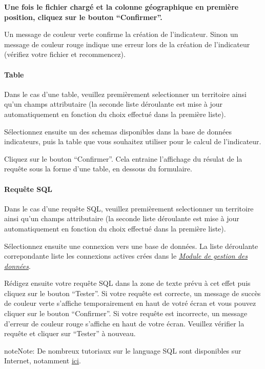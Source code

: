 \documentclass[letterpaper,10pt,french]{sphinxmanual}
\begin{document}
\textbf{Une fois le fichier chargé et la colonne géographique en première position, cliquez sur le bouton ``Confirmer''.}

Un message de couleur verte confirme la création de l'indicateur. Sinon un message de couleur rouge indique une erreur lors de la création de l'indicateur (vérifiez votre fichier et recommencez).


\paragraph{Table}
\label{indicators/indicatorspanel:table}
Dans le cas d'une table, veuillez premièrement selectionner un territoire ainsi qu'un champs attributaire (la seconde liste déroulante est mise à jour automatiquement en fonction du choix effectué dans la première liste).

Sélectionnez ensuite un des schemas disponibles dans la base de données indicateurs, puis la table que vous souhaitez utiliser pour le calcul de l'indicateur.

Cliquez sur le bouton ``Confirmer''. Cela entraine l'affichage du résulat de la requête sous la forme d'une table, en dessous du formulaire.


\paragraph{Requête SQL}
\label{indicators/indicatorspanel:requete-sql}
Dans le cas d'une requête SQL, veuillez premièrement selectionner un territoire ainsi qu'un champs attributaire (la seconde liste déroulante est mise à jour automatiquement en fonction du choix effectué dans la première liste).

Sélectionnez ensuite une connexion vers une base de données. La liste déroulante correpondante liste les connexions actives crées dans le {\hyperref[data/index::doc]{\emph{\emph{Module de gestion des données}}}}.

Rédigez ensuite votre requête SQL dans la zone de texte prévu à cet effet puis cliquez sur le bouton ``Tester''. Si votre requête est correcte, un message de succès de couleur verte s'affiche temporairement en haut de votré écran et vous  pouvez cliquer sur le bouton ``Confirmer''. Si votre requête est incorrecte, un message d'erreur de couleur rouge s'affiche en haut de votre écran. Veuillez vérifier la requête et cliquer sur ``Tester'' à nouveau.

\begin{notice}{note}{Note:}
De nombreux tutoriaux sur le language SQL sont disponibles sur Internet, notamment \href{http://sql.developpez.com/}{ici}.
\end{notice}
\end{document}
